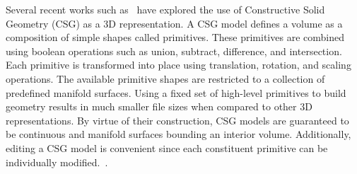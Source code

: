 Several recent works such as~\cite{Sharma2018, Kania2020, Ren2021} have explored the use of Constructive Solid Geometry (CSG) as a 3D representation. A CSG model defines a volume as a composition of simple shapes called primitives. These primitives are combined using boolean operations such as union, subtract, difference, and intersection. Each primitive is transformed into place using translation, rotation, and scaling operations. The available primitive shapes are restricted to a collection of predefined manifold surfaces. Using a fixed set of high-level primitives to build geometry results in much smaller file sizes when compared to other 3D representations. By virtue of their construction, CSG models are guaranteed to be continuous and manifold surfaces bounding an interior volume. Additionally, editing a CSG model is convenient since each constituent primitive can be individually modified.~\cite{Hughes2013}.

